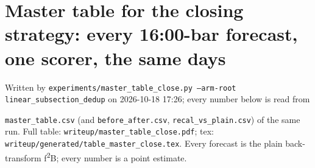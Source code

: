 \documentclass[10pt]{article}
\begin{document}
\setlength{\LTcapwidth}{\textwidth}

\section*{Master table for the closing strategy: every 16:00-bar forecast, one scorer, the same days}
Written by \texttt{experiments/\allowbreak{}master\_table\_close.py --arm-root linear\_subsection\_dedup} on 2026-10-18 17:26; every number below is read from\par
\texttt{master\_table.csv} (and \texttt{before\_after.csv}, \texttt{recal\_vs\_plain.csv}) of the same run. Full table: \texttt{writeup/\allowbreak{}master\_table\_close.pdf}; tex: \texttt{writeup/\allowbreak{}generated/\allowbreak{}table\_master\_close.tex}. Every forecast is the plain back-transform f\textsuperscript{2}\textperiodcentered{}B; every number is a point estimate.\par
\end{document}
